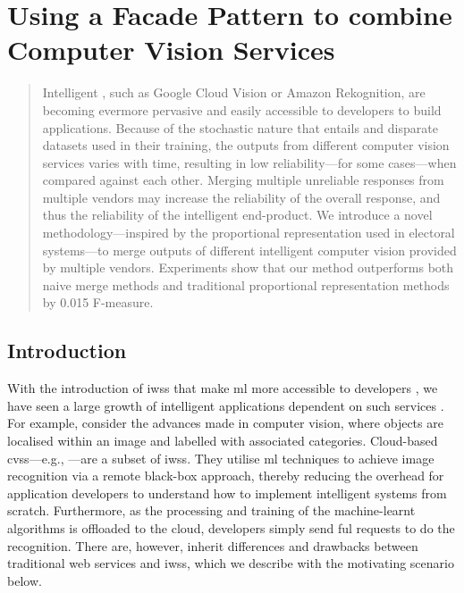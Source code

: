 \chapter[Using a Facade Pattern to combine Computer Vision Services]
{Using a Facade Pattern to combine Computer Vision Services}
\label{ch:icwe2019}
\graphicspath{{mainmatter/publications/figures/icwe2019/}}

\glsresetall
\begin{abstract}
Intelligent , such as Google Cloud Vision or Amazon Rekognition, are becoming evermore pervasive and easily accessible to developers to build applications.
Because of the stochastic nature that  entails and disparate datasets used in their training, the outputs from different computer vision services varies with time, resulting in low reliability---for some cases---when compared against each other.
Merging multiple unreliable  responses from multiple vendors may increase the reliability of the overall response, and thus the reliability of the intelligent end-product.
We introduce a novel methodology---inspired by the proportional representation used in electoral systems---to merge outputs of different intelligent computer vision  provided by multiple vendors.
Experiments show that our method outperforms both naive merge methods and traditional proportional representation methods by 0.015 F-measure.
\end{abstract}
\glsresetall

\section{Introduction}

With the introduction of \glspl{iws} that make \gls{ml} more accessible to developers \citep{Ribeiro:2015dz,Hwang:2017tr}, we have seen a large growth of intelligent applications dependent on such services \citep{Mapillar97:online,FileShad33:online}.
For example, consider the advances made in computer vision, where objects are localised within an image and labelled with associated categories.
Cloud-based \glspl{cvs}---e.g., ---are a subset of \glspl{iws}. They utilise \gls{ml} techniques to achieve image recognition via a remote black-box approach, thereby reducing the overhead for application developers to understand how to implement intelligent systems from scratch. Furthermore, as the processing and training of the machine-learnt algorithms is offloaded to the cloud, developers simply send ful  requests to do the recognition. There are, however, inherit differences and drawbacks between traditional web services and \glspl{iws}, which we describe with the motivating scenario below.

